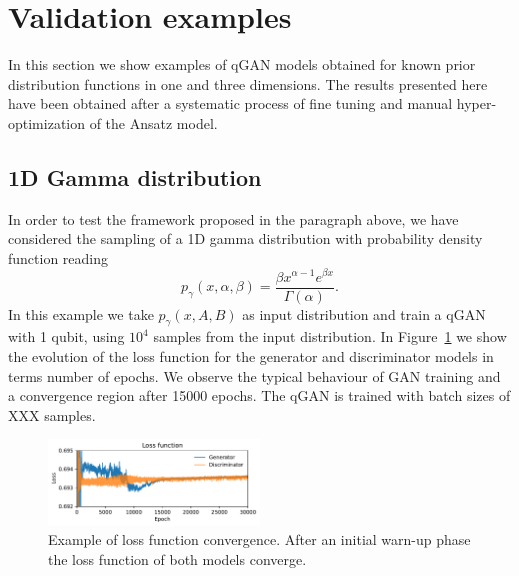 \documentclass[twocolumn,preprintnumbers,superscriptaddress]{revtex4-2}
\begin{document}
\section{Validation examples}
\label{sec:validation}

In this section we show examples of qGAN models obtained for known prior
distribution functions in one and three dimensions. The results presented here
have been obtained after a systematic process of fine tuning and manual
hyper-optimization of the Ansatz model.

\subsection{1D Gamma distribution}

In order to test the framework proposed in the paragraph above, we have
considered the sampling of a 1D gamma distribution with probability density
function reading
\begin{equation}
  p_\gamma (x, \alpha, \beta) = \frac{\beta x^{\alpha-1} e^{\beta x}}{\Gamma(\alpha)}.
\end{equation}
In this example we take {\color{red} $p_\gamma (x, A, B)$} as input distribution
and train a qGAN with 1 qubit, using $10^4$ samples from the input distribution.
%
In Figure~\ref{fig:loss} we show the evolution of the loss function for the
generator and discriminator models in terms number of epochs. We observe the
typical behaviour of GAN training and a convergence region after 15000 epochs.
%
The qGAN is trained with batch sizes of {\color{red}XXX} samples.

\begin{figure}
  \includegraphics[width=0.5\textwidth]{plots/1Dgamma/1Dgamma_loss.pdf}
  \caption{\label{fig:loss}Example of loss function convergence. After an
  initial warn-up phase the loss function of both models converge.}
\end{figure}
\end{document}
